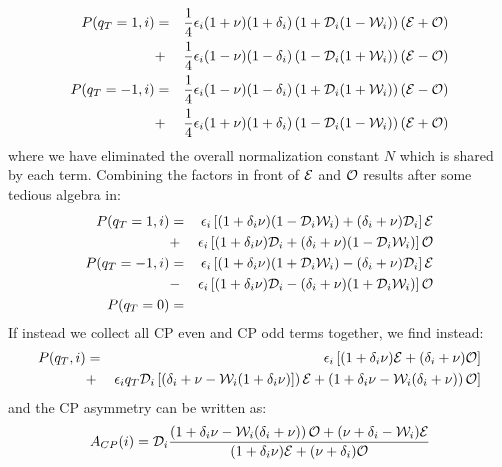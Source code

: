 \documentclass[a4paper,9pt,twoside]{article}
\begin{document}
\begin{eqnarray}
   P(q_T=1,i)  &=&\frac{1}{4} \epsilon_i(1+\nu)(1+\delta_i)\left(1+{\cal D}_i(1-{\cal W}_i)\right)\left({\cal E}+{\cal O}\right)  
\\             &+&\frac{1}{4} \epsilon_i(1-\nu)(1-\delta_i)\left(1-{\cal D}_i(1+{\cal W}_i)\right)\left({\cal E}-{\cal O}\right)  
\\ P(q_T=-1,i) &=&\frac{1}{4} \epsilon_i(1-\nu)(1-\delta_i)\left(1+{\cal D}_i(1+{\cal W}_i)\right)\left({\cal E}-{\cal O}\right) 
\\             &+&\frac{1}{4} \epsilon_i(1+\nu)(1+\delta_i)\left(1-{\cal D}_i(1-{\cal W}_i)\right)\left({\cal E}+{\cal O}\right)
\end{eqnarray}
where we have eliminated the overall normalization constant $N$ which is shared by each term. 
Combining the factors in front of ${\cal E}$ 
and ${\cal O}$ results after some tedious algebra in:
\begin{eqnarray}
     P(q_T=1,i)  
           &=& \epsilon_i\left[ (1+\delta_i\nu)  (1-{\cal D}_i {\cal W}_i)  +  (\delta_i+\nu)     {\cal D}_i       \right]{\cal E}
\label{eq:substrule_s}
\\         &+& \epsilon_i\left[ (1+\delta_i\nu)     {\cal D}_i              +  (\delta_i+\nu)  (1-{\cal D}_i{\cal W}_i ) \right]{\cal O}
\\   P(q_T=-1,i) 
           &=& \epsilon_i\left[ (1+\delta_i\nu)  (1+{\cal D}_i {\cal W}_i)  -  (\delta_i+\nu)     {\cal D}_i       \right]{\cal E}
\\         &-& \epsilon_i\left[ (1+\delta_i\nu)     {\cal D}_i              -  (\delta_i+\nu)  (1+{\cal D}_i{\cal W}_i ) \right]{\cal O}
\label{eq:substrule_e}
\\   P(q_T=0)    &=&
\end{eqnarray}
If instead we collect all CP even and CP odd terms together, we find instead:
\begin{eqnarray}
     P(q_T,i)  &=& \epsilon_i\left[ (1+\delta_i\nu){\cal E} + (\delta_i+\nu){\cal O} \right]
\\             &+& \epsilon_i q_T {\cal D}_i \left[ \left( \delta_i + \nu -{\cal W}_i(1+\delta_i\nu) ]\right) { \cal E} + \left( 1+\delta_i\nu - {\cal W}_i(\delta_i+\nu) \right){\cal O}  \right]
\end{eqnarray}
and the CP asymmetry can be written as:
\begin{equation}
  A_{CP}(i) =  {\cal D}_i \frac{\left( 1+\delta_i\nu - {\cal W}_i(\delta_i+\nu) \right){\cal O}+(\nu+\delta_i-{\cal W}_i ){\cal E}}
                               {(1+\delta_i\nu){\cal E}+(\nu+\delta_i){\cal O} }
\end{equation}
\end{document}
